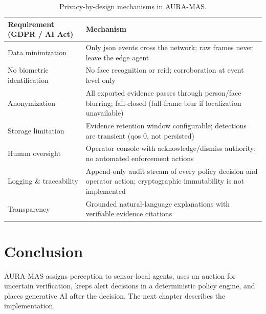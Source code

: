 \begin{table}[H]
\centering
\caption{Privacy-by-design mechanisms in AURA-MAS.}
\label{tab:privacy}
\small
\begin{tabular}{p{4.5cm}p{8.5cm}}
\toprule
\textbf{Requirement (GDPR / AI Act)} & \textbf{Mechanism} \\
\midrule
Data minimization & Only \gls{json} events cross the network; raw frames never leave the edge agent \\
No biometric identification & No face recognition or \gls{reid}; corroboration at event level only \\
Anonymization & All exported evidence passes through person/face blurring; fail-closed (full-frame blur if localization unavailable) \\
Storage limitation & Evidence retention window configurable; detections are transient (\gls{qos} 0, not persisted) \\
Human oversight & Operator console with acknowledge/dismiss authority; no automated enforcement actions \\
Logging \& traceability & Append-only audit stream of every policy decision and operator action; cryptographic immutability is not implemented \\
Transparency & Grounded natural-language explanations with verifiable evidence citations \\
\bottomrule
\end{tabular}
\end{table}

\section{Conclusion}

AURA-MAS assigns perception to sensor-local agents, uses an auction for uncertain verification, keeps alert decisions in a deterministic policy engine, and places generative AI after the decision. The next chapter describes the implementation.
